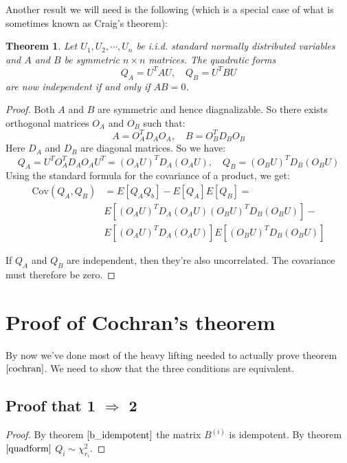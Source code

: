 \documentclass[12pt, a4paper]{article}
\newtheorem{theorem}{Theorem}
\begin{document}
Another result we will need is the following (which is a special case of what is sometimes known as Craig's theorem):
\begin{theorem}
\label{craig}
Let $U_1, U_2,\cdots,U_n$ be i.i.d. standard normally distributed variables and $A$ and $B$ be symmetric $n\times n$ matrices. The quadratic forms
\begin{equation}
Q_A=U^TAU,\quad Q_B=U^TBU
\end{equation}
are now independent if and only if $AB=0$.
\end{theorem}
\begin{proof}
Both $A$ and $B$ are symmetric and hence diagnalizable. So there exists orthogonal matrices $O_A$ and $O_B$ such that:
\begin{equation}
A=O_A^T D_A O_A,\quad B=O_B^T D_B O_B
\end{equation}
Here $D_A$ and $D_B$ are diagonal matrices. So we have:
\begin{equation}
Q_A=U^T O_A^T D_A O_A U^T = (O_A U)^T D_A (O_A U),\quad Q_B=(O_B U)^T D_B (O_B U)
\end{equation}
Using the standard formula for the covariance of a product, we get:
\begin{align*}
\textrm{Cov}(Q_A,Q_B) & =E[Q_AQ_b]-E[Q_A]E[Q_B]=\\
& E[(O_A U)^T D_A (O_A U)(O_B U)^T D_B (O_B U)]-\\
& E[(O_A U)^T D_A (O_A U)]E[(O_B U)^T D_B (O_B U)]
\end{align*}

If $Q_A$ and $Q_B$ are independent, then they're also uncorrelated. The covariance must therefore be zero. 
\end{proof}

\section{Proof of Cochran's theorem}
By now we've done most of the heavy lifting needed to actually prove theorem $\ref{cochran}$. We need to show that the three conditions are equivalent.

\subsection{Proof that 1 $\Rightarrow$ 2}
\begin{proof}
By theorem $\ref{b_idempotent}$ the matrix $B^{(i)}$ is idempotent. By theorem $\ref{quadform}$ $Q_i\sim\chi^2_{r_i}$.
\end{proof}
\end{document}
